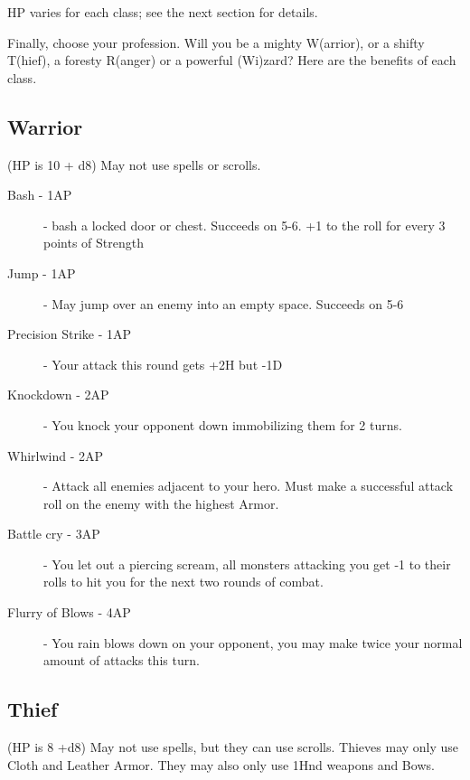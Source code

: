 \documentclass[a6paper,hidelinks]{article}
\begin{document}
HP varies for each class; see the next section for details.

Finally, choose your profession. Will you be a mighty W(arrior), or a shifty T(hief), a foresty R(anger) or a powerful (Wi)zard? Here are the benefits of each class.

\subsection{Warrior}

(HP is 10 + d8) May not use spells or scrolls.

\begin{description}

\item[Bash - 1AP] - bash a locked door or chest. Succeeds on 5-6. +1 to the roll for every 3 points of Strength
\item[Jump - 1AP] - May jump over an enemy into an empty space. Succeeds on 5-6
\item[Precision Strike - 1AP] - Your attack this round gets +2H but -1D
\item[Knockdown - 2AP] - You knock your opponent down immobilizing them for 2 turns.
\item[Whirlwind - 2AP] - Attack all enemies adjacent to your hero. Must make a successful attack roll on the enemy with the highest Armor.
\item[Battle cry - 3AP] - You let out a piercing scream, all monsters attacking you get -1 to their rolls to hit you for the next two rounds of combat.
\item[Flurry of Blows - 4AP] - You rain blows down on your opponent, you may make twice your normal amount of attacks this turn.


\end{description}

\subsection{Thief}

(HP is 8 +d8) May not use spells, but they can use scrolls. Thieves may only use Cloth and Leather Armor. They may also only use 1Hnd weapons and Bows.
\end{document}
